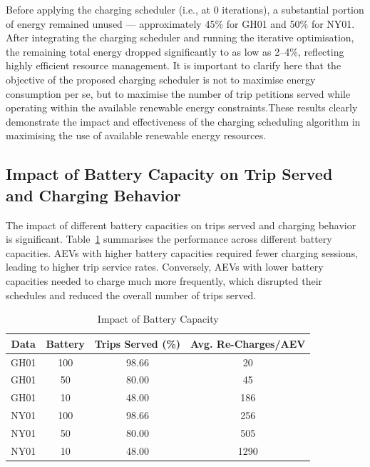Before applying the charging scheduler (i.e., at 0 iterations), a substantial portion of energy remained unused --- approximately 45\% for GH01 and 50\% for NY01. After integrating the charging scheduler and running the iterative optimisation, the remaining total energy dropped significantly to as low as 2--4\%, reflecting highly efficient resource management. It is important to clarify here that the objective of the proposed charging scheduler is not to maximise energy consumption per se, but to maximise the number of trip petitions served while operating within the available renewable energy constraints.These results clearly demonstrate the impact and effectiveness of the charging scheduling algorithm in maximising the use of available renewable energy resources.


\subsection{Impact of Battery Capacity on Trip Served and Charging Behavior}

The impact of different battery capacities on trips served and charging behavior is significant. Table~\ref{tab:battery_capacity} summarises the performance across different battery capacities. AEVs with higher battery capacities required fewer charging sessions, leading to higher trip service rates. Conversely, AEVs with lower battery capacities needed to charge much more frequently, which disrupted their schedules and reduced the overall number of trips served.

\begin{table}[htbp]
\caption{Impact of Battery Capacity}
\begin{center}
\begin{tabular}{|c|c|c|c|}
\hline
\textbf{Data} & \textbf{Battery} & \textbf{Trips Served (\%)} & \textbf{Avg. Re-Charges/AEV} \\
\hline
GH01 & 100 & 98.66 & 20 \\
GH01 & 50 & 80.00 & 45 \\
GH01 & 10 & 48.00 & 186 \\
NY01 & 100 & 98.66 & 256 \\
NY01 & 50 & 80.00 & 505 \\
NY01 & 10 & 48.00 & 1290 \\
\hline
\end{tabular}
\label{tab:battery_capacity}
\end{center}
\end{table}

